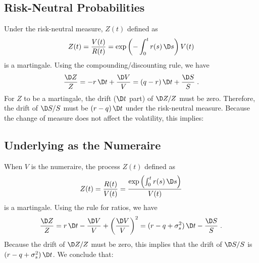 \subsection*{Risk-Neutral Probabilities}
Under the risk-neutral measure, $Z(t)$ defined as 
$$Z(t) = \frac{V(t)}{R(t)} = \exp\left(-\int_0^t r(s)\,\D s\right)V(t)$$
is a martingale.  Using the compounding/discounting rule, we have
$$\frac{\D Z}{Z} =-r\,\D t + \frac{\D V}{V} = (q-r)\,\D t + \frac{\D S}{S}\; .$$
For $Z$ to be a martingale, the drift ($\D t$ part) of $\D Z/Z$ must be zero.  Therefore, the drift of $\D S/S$ must be $(r-q)\,\D t$ under the risk-neutral measure.  Because the change of measure does not affect the volatility, this implies:


\subsection*{Underlying as the Numeraire}
When $V$ is the numeraire, the process
$Z(t)$ defined as 
$$Z(t) = \frac{R(t)}{V(t)} = \frac{\exp\left(\int_0^t r(s)\,\D s\right)}{V(t)}$$
is a martingale.  Using the rule for ratios, we have
$$\frac{\D Z}{Z} =r\,\D t - \frac{\D V}{V} + \left(\frac{\D V}{V}\right)^2 = (r -q+ \sigma^2_s)\,\D t - \frac{\D S}{S}\; .$$
Because the drift of $\D Z/Z$ must be zero, this implies that the drift of $\D S/
S$ is $(r -q + \sigma^2_s)\,\D t$.  We conclude that:


